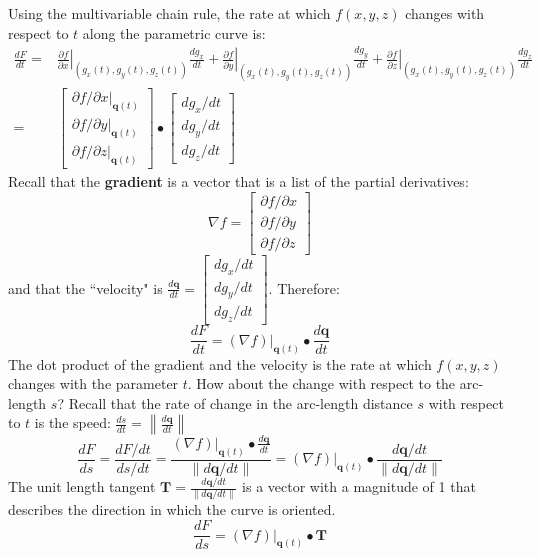 \documentclass{article}
\begin{document}
Using the multivariable chain rule, the rate at which \(f(x,y,z)\) changes with respect to \(t\) along the parametric curve is:
\begin{align*}
\frac{dF}{dt} = & \left.\frac{\partial f}{\partial x}\right|_{(g_x(t), g_y(t), g_z(t))} \frac{dg_x}{dt} + \left.\frac{\partial f}{\partial y}\right|_{(g_x(t), g_y(t), g_z(t))} \frac{dg_y}{dt} + \left.\frac{\partial f}{\partial z}\right|_{(g_x(t), g_y(t), g_z(t))} \frac{dg_z}{dt} \\
= & \begin{bmatrix} \left.\partial f/\partial x\right|_{\mathbf{q}(t)} \\ \left.\partial f/\partial y\right|_{\mathbf{q}(t)} \\ \left.\partial f/\partial z\right|_{\mathbf{q}(t)} \end{bmatrix} \bullet \begin{bmatrix} dg_x/dt \\ dg_y/dt \\ dg_z/dt \end{bmatrix}
\end{align*}
Recall that the {\bf gradient} is a vector that is a list of the partial derivatives: 
\[\nabla f = \begin{bmatrix} \partial f/\partial x \\ \partial f/\partial y \\ \partial f/\partial z \end{bmatrix}\]
and that the ``velocity" is \(\frac{d\mathbf{q}}{dt} = \begin{bmatrix} dg_x/dt \\ dg_y/dt \\ dg_z/dt \end{bmatrix}\). Therefore:
\[\frac{dF}{dt} = (\nabla f)\Big|_{\mathbf{q}(t)} \bullet \frac{d\mathbf{q}}{dt}\]
The dot product of the gradient and the velocity is the rate at which \(f(x,y,z)\) changes with the parameter \(t\). How about the change with respect to the arc-length \(s\)? Recall that the rate of change in the arc-length distance \(s\) with respect to \(t\) is the speed: \(\frac{ds}{dt} = \left\|\frac{d\mathbf{q}}{dt}\right\|\)
\[\frac{dF}{ds} = \frac{dF/dt}{ds/dt} 
= \frac{(\nabla f)\Big|_{\mathbf{q}(t)} \bullet \frac{d\mathbf{q}}{dt}}{\left\|d\mathbf{q}/dt\right\|} 
= (\nabla f)\Big|_{\mathbf{q}(t)} \bullet \frac{d\mathbf{q}/dt}{\left\|d\mathbf{q}/dt\right\|}\]
The unit length tangent \(\mathbf{T} = \frac{d\mathbf{q}/dt}{\left\|d\mathbf{q}/dt\right\|}\) is a vector with a magnitude of 1 that describes the direction in which the curve is oriented.
\[\frac{dF}{ds} = (\nabla f)\Big|_{\mathbf{q}(t)} \bullet \mathbf{T}\]
\end{document}
